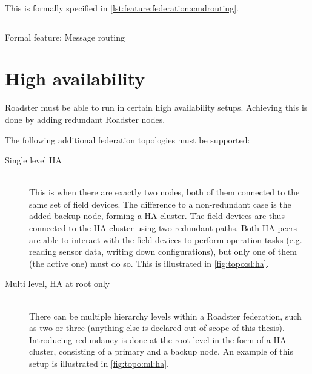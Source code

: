This is formally specified in \autoref{lst:feature:federation:cmdrouting}.

\begin{listing}
	\inputminted{Gherkin}{listings/features/federation/message_routing.feature}
	\caption{Formal feature: Message routing}
	\label{lst:feature:federation:cmdrouting}
\end{listing}

\section{High availability}
Roadster must be able to run in certain high availability setups. Achieving
this is done by adding redundant Roadster nodes.

The following additional federation topologies must be supported:
\begin{description}
	\item [ Single level \gls{HA} ] \hfill\\
		This is when there are exactly two nodes, both of them
		connected to the same set of field devices. The difference to a
		non-redundant case is the added backup node, forming a HA
		cluster. The field devices are thus connected to the HA cluster
		using two redundant paths. Both HA peers are able to interact
		with the field devices to perform operation tasks (e.g. reading
		sensor data, writing down configurations), but only one of them
		(the active one) must do so. This is illustrated in
		\autoref{fig:topo:sl:ha}.

	\item [ Multi level, \gls{HA} at root only ] \hfill\\
		There can be multiple hierarchy levels within a Roadster federation, such as two or
		three (anything else is declared out of scope of this thesis). Introducing
		redundancy is done at the root level in the form of a HA
		cluster, consisting of a primary and a backup node. An example of this setup is illustrated in
		\autoref{fig:topo:ml:ha}.
\end{description}

